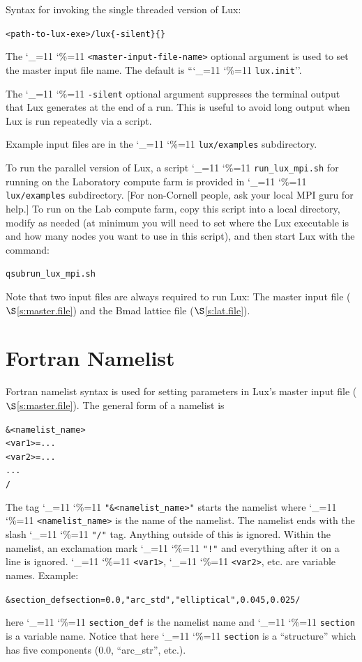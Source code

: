 \documentclass[11pt]{article}
\newcommand{\lux}{Lux\xspace}
\newcommand\ttcmd{\begingroup\catcode`\_=11 \catcode`\%=11 \dottcmd}
\newcommand\dottcmd[1]{\texttt{#1}\endgroup}
\newcommand{\vn}{\ttcmd}
\newcommand{\sref}[1]{$\S$\ref{#1}}
\newenvironment{example}
  {\vspace{\ExBeg} \begin{alltt}}
  {\end{alltt} \vspace{\ExEnd}}
\newlength{\ExBeg}
\newlength{\ExEnd}
\begin{document}
Syntax for invoking the single threaded version of \lux:
\begin{example}
 <path-to-lux-exe>/lux \{-silent\} \{<master-input-file-name>\}
\end{example}
The \vn{<master-input-file-name>} optional argument is used to set the
master input file name. The default is ``\vn{lux.init}''. 

The \vn{-silent} optional argument suppresses the terminal output that
\lux generates at the end of a run. This is useful to avoid long
output when \lux is run repeatedly via a script.

Example input files are in the \vn{lux/examples} subdirectory.

To run the parallel version of \lux, a script \vn{run_lux_mpi.sh} for
running on the Laboratory compute farm is provided in
\vn{lux/examples} subdirectory. [For non-Cornell people, ask your
local MPI guru for help.] To run on the Lab compute farm, copy this
script into a local directory, modify as needed (at minimum you will
need to set where the \lux executable is and how many nodes you want
to use in this script), and then start \lux with the command:
\begin{example}
  qsub run_lux_mpi.sh
\end{example}

Note that two input files are always required to run \lux: The master input file
(\sref{s:master.file}) and the Bmad lattice file (\sref{s:lat.file}).

\section{Fortran Namelist}
\label{s:namelist}

Fortran namelist syntax is used for setting parameters in \lux's
master input file (\sref{s:master.file}). The general form of a
namelist is
\begin{example}
  &<namelist_name>
    <var1> = ...
    <var2> = ...
    ...
  /
\end{example}
The tag \vn{"\&<namelist_name>"} starts the namelist where
\vn{<namelist_name>} is the name of the namelist. The namelist ends
with the slash \vn{"/"} tag. Anything outside of this is
ignored. Within the namelist, an exclamation mark \vn{"!"} and
everything after it on a line is ignored. \vn{<var1>}, \vn{<var2>},
etc. are variable names. Example:
\begin{example}
  &section_def section =   0.0, "arc_std", "elliptical", 0.045, 0.025 /
\end{example}
here \vn{section_def} is the namelist name and \vn{section} is a variable
name.  Notice that here \vn{section} is a ``structure'' which has five
components (0.0, ``arc_str'', etc.).
\end{document}
